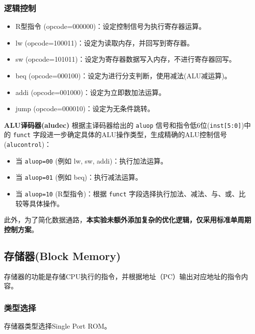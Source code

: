 \subsubsection{逻辑控制}
\begin{itemize} \item R型指令 (opcode=000000)：设定控制信号为执行寄存器运算。 \item lw (opcode=100011)：设定为读取内存，并回写到寄存器。 \item sw (opcode=101011)：设定为寄存器数据写入内存，不进行寄存器回写。 \item beq (opcode=000100)：设定为进行分支判断，使用减法(ALU减运算)。 \item addi (opcode=001000)：设定为立即数加法运算。 \item jump (opcode=000010)：设定为无条件跳转。 \end{itemize}

\textbf{ALU译码器(aludec)} 根据主译码器给出的 \texttt{aluop} 信号和指令低6位(\texttt{inst[5:0]})中的 \texttt{funct} 字段进一步确定具体的ALU操作类型，生成精确的ALU控制信号(\texttt{alucontrol})：

\begin{itemize} \item 当 \texttt{aluop=00} (例如 lw, sw, addi)：执行加法运算。 \item 当 \texttt{aluop=01} (例如 beq)：执行减法运算。 \item 当 \texttt{aluop=10} (R型指令)：根据 \texttt{funct} 字段选择执行加法、减法、与、或、比较等具体操作。 \end{itemize}

此外，为了简化数据通路，\textbf{本实验未额外添加复杂的优化逻辑，仅采用标准单周期控制方案}。

\subsection{存储器(Block Memory)}\label{sub:ctl}
存储器的功能是存储CPU执行的指令，并根据地址（PC）输出对应地址的指令内容。
\subsubsection{类型选择}
存储器类型选择Single Port ROM。
